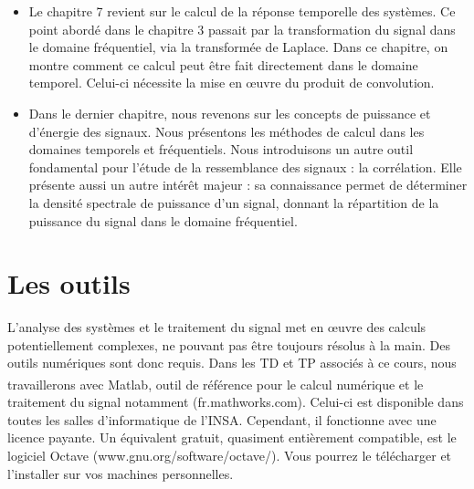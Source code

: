 \begin{itemize}
		\item Le chapitre 7 revient sur le calcul de la réponse temporelle des systèmes. Ce point abordé dans le chapitre 3 passait par la transformation du signal dans le domaine fréquentiel, via la transformée de Laplace. Dans ce chapitre, on montre comment ce calcul peut être fait directement dans le domaine temporel. Celui-ci nécessite la mise en œuvre du produit de convolution. 
		\item Dans le dernier chapitre, nous revenons sur les concepts de puissance et d'énergie des signaux. Nous présentons les méthodes de calcul dans les domaines temporels et fréquentiels. Nous introduisons un autre outil fondamental pour l'étude de la ressemblance des signaux : la corrélation. Elle présente aussi un autre intérêt majeur : sa connaissance permet de déterminer la densité spectrale de puissance d'un signal, donnant la répartition de la puissance du signal dans le domaine fréquentiel.
	\end{itemize}
	
	
	\section{Les outils}
	L'analyse des systèmes et le traitement du signal met en œuvre des calculs potentiellement complexes, ne pouvant pas être toujours résolus à la main. Des outils numériques sont donc requis.
	Dans les TD et TP associés à ce cours, nous travaillerons avec Matlab\textsuperscript{\textregistered}, outil de référence pour le calcul numérique et le traitement du signal notamment (fr.mathworks.com). Celui-ci est disponible dans toutes les salles d'informatique de l'INSA. Cependant, il fonctionne avec une licence payante. Un équivalent gratuit, quasiment entièrement compatible, est le logiciel Octave (www.gnu.org/software/octave/). Vous pourrez le télécharger et l'installer sur vos machines personnelles.
	